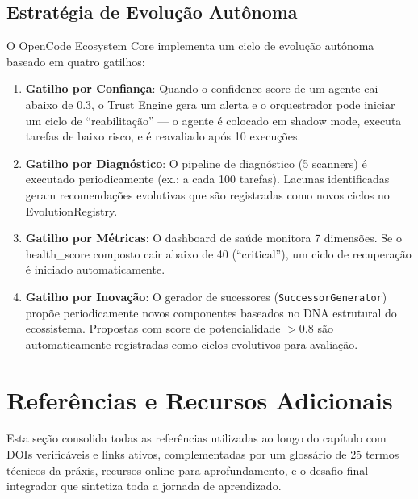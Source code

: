 \subsection{Estratégia de Evolução Autônoma}
\label{sec:evolucao-autonoma}

O OpenCode Ecosystem Core implementa um ciclo de evolução autônoma baseado em quatro gatilhos:

\begin{enumerate}
  \item \textbf{Gatilho por Confiança}: Quando o confidence score de um agente cai abaixo de 0.3, o Trust Engine gera um alerta e o orquestrador pode iniciar um ciclo de ``reabilitação'' — o agente é colocado em shadow mode, executa tarefas de baixo risco, e é reavaliado após 10 execuções.
  
  \item \textbf{Gatilho por Diagnóstico}: O pipeline de diagnóstico (5 scanners) é executado periodicamente (ex.: a cada 100 tarefas). Lacunas identificadas geram recomendações evolutivas que são registradas como novos ciclos no EvolutionRegistry.
  
  \item \textbf{Gatilho por Métricas}: O dashboard de saúde monitora 7 dimensões. Se o health\_score composto cair abaixo de 40 (``critical''), um ciclo de recuperação é iniciado automaticamente.
  
  \item \textbf{Gatilho por Inovação}: O gerador de sucessores (\texttt{SuccessorGenerator}) propõe periodicamente novos componentes baseados no DNA estrutural do ecossistema. Propostas com score de potencialidade $> 0.8$ são automaticamente registradas como ciclos evolutivos para avaliação.
\end{enumerate}

\section{Referências e Recursos Adicionais}
\label{sec:refs-praxis}

Esta seção consolida todas as referências utilizadas ao longo do capítulo com DOIs verificáveis e links ativos, complementadas por um glossário de 25 termos técnicos da práxis, recursos online para aprofundamento, e o desafio final integrador que sintetiza toda a jornada de aprendizado.

